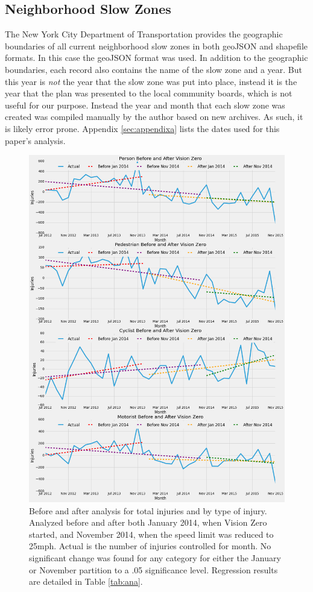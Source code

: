 \documentclass[10pt,journal,compsoc]{IEEEtran}
\begin{document}
\subsection{Neighborhood Slow Zones}

The New York City Department of Transportation provides the geographic boundaries of all current neighborhood slow zones in both geoJSON and shapefile formats\cite{slowzones}.  In this case the geoJSON format was used.  In addition to the geographic boundaries, each record also contains the name of the slow zone and a year.  But this year is \textit{not} the year that the slow zone was put into place, instead it is the year that the plan was presented to the local community boards, which is not useful for our purpose.  Instead the year and month that each slow zone  was created was compiled manually by the author based on new archives.  As such, it is likely error prone.  Appendix \ref{sec:appendixa} lists the dates used for this paper's analysis.

\begin{figure}[p]
	\centering
	\includegraphics[width=\textwidth]{fig2.png}
	\caption{Before and after analysis for total injuries and by type of injury.  Analyzed before and after both January 2014, when Vision Zero started, and November 2014, when the speed limit was reduced to 25mph.  Actual is the number of injuries controlled for month.  No significant change was found for any category for either the January or November partition to a .05 significance level.  Regression results are detailed in Table \ref{tab:ana}.}\label{fig:injuryana}
\end{figure}
\end{document}
